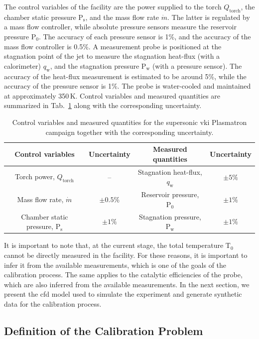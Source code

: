 The control variables of the facility are the power supplied to the torch $Q_{\text{torch}}$, the chamber static pressure $\mathrm{P}_{\text{s}}$, and the mass flow rate $\dot{m}$. The latter is regulated by a mass flow controller, while absolute pressure sensors measure the reservoir pressure $\mathrm{P}_{0}$. The accuracy of each pressure sensor is 1\%, and the accuracy of the mass flow controller is 0.5\%. A measurement probe is positioned at the stagnation point of the jet to measure the stagnation heat-flux (with a calorimeter) $q_\mathrm{w}$, and the stagnation pressure $\mathrm{P}_\mathrm{w}$ (with a pressure sensor). The accuracy of the heat-flux measurement is estimated to be around 5\%, while the accuracy of the pressure sensor is 1\%. The probe is water-cooled and maintained at approximately 350\,K. Control variables and measured quantities are summarized in Tab.~\ref{tab:SupersonicCampaign} along with the corresponding uncertainty.

\begin{table}[htbp]
\centering
\caption{Control variables and measured quantities for the supersonic \gls{vki} Plasmatron campaign together with the corresponding uncertainty.}
\begin{tabular}{cc|cc}
\hline
Control variables & Uncertainty & Measured quantities & Uncertainty\\
\hline
Torch power, $Q_{\text{torch}}$ & -- & Stagnation heat-flux, $q_\mathrm{w}$ & $\pm 5\%$ \\
Mass flow rate, $\dot{m}$ & $\pm 0.5\%$ & Reservoir pressure, $\mathrm{P}_0$ & $\pm 1\%$ \\
Chamber static pressure, $\mathrm{P}_\text{s}$ & $\pm 1\%$ & Stagnation pressure, $\mathrm{P}_\mathrm{w}$ & $\pm 1\%$ \\
\hline
\end{tabular}
\label{tab:SupersonicCampaign}
\end{table}

It is important to note that, at the current stage, the total temperature $\mathrm{T}_0$ cannot be directly measured in the facility. For these reasons, it is important to infer it from the available measurements, which is one of the goals of the calibration process. The same applies to the catalytic efficiencies of the probe, which are also inferred from the available measurements. In the next section, we present the \gls{cfd} model used to simulate the experiment and generate synthetic data for the calibration process.

\subsection{Definition of the Calibration Problem}

